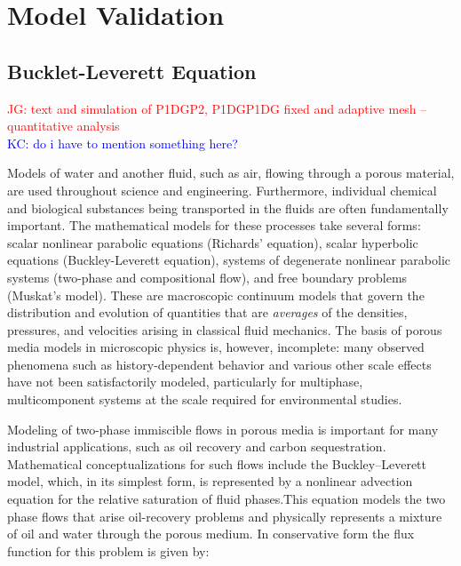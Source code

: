 \documentclass[preprint,authoryear,12pt]{elsarticle}
\begin{document}
 
\section{Model Validation}\label{section:ModelValidation}
 
\subsection{Bucklet-Leverett Equation}\label{section:BuckletLeverettEquation}
\textcolor{red}{JG: text and simulation of P1DGP2, P1DGP1DG fixed and adaptive mesh -- quantitative analysis}\\
\textcolor{blue}{KC: do i have to mention something here?\\}

Models of water and another fluid, such as air, flowing through a
porous material, are used throughout science and
engineering.  Furthermore, individual chemical and biological
substances being transported in the fluids are often fundamentally
important. The mathematical models for these processes take several forms: scalar nonlinear parabolic equations (Richards' equation), scalar hyperbolic equations (Buckley-Leverett equation), systems of degenerate nonlinear parabolic systems (two-phase and compositional flow), and free boundary problems (Muskat's model). These are macroscopic continuum models that govern the distribution and evolution of quantities that are {\em averages} of the densities, pressures, and velocities arising in classical fluid mechanics. The basis of porous media models in microscopic physics is, however, incomplete: many observed phenomena such as history-dependent behavior and various other scale effects have not been satisfactorily modeled, particularly for multiphase,
multicomponent systems at the scale required for environmental
studies.

Modeling of two-phase immiscible flows in porous media is
important for many industrial applications, such as oil recovery and carbon sequestration. Mathematical conceptualizations for such flows include the Buckley–Leverett model, which, in its simplest form, is represented by a nonlinear advection equation for the relative saturation of fluid phases.This equation models the two phase flows that arise oil-recovery problems and physically
represents a mixture of oil and water through the porous medium.
In conservative form the flux function for this
problem is given by:
\end{document}
